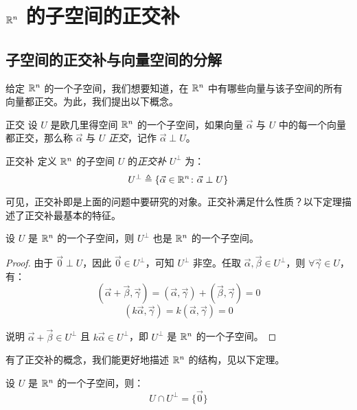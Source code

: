
\section{$\mathbb R^n$ 的子空间的正交补}

\subsection{子空间的正交补与向量空间的分解}

给定 $\mathbb R^n$ 的一个子空间，我们想要知道，在 $\mathbb R^n$ 中有哪些向量与该子空间的所有向量都正交。为此，我们提出以下概念。

\begin{definition}{正交}
	设 $U$ 是欧几里得空间 $\mathbb R^n$ 的一个子空间，如果向量 $\vec \alpha$ 与 $U$ 中的每一个向量都正交，那么称 $\vec \alpha$ 与 $U$ \emph{正交}，记作 $\vec \alpha \perp U$。
\end{definition}

\begin{definition}{正交补}
	定义 $\mathbb R^n$ 的子空间 $U$ 的\emph{正交补} $U^\perp$ 为：
	$$
	U^\perp \triangleq \{ \vec \alpha \in \mathbb R^n \colon \vec \alpha \perp U \}
	$$
\end{definition}

可见，正交补即是上面的问题中要研究的对象。正交补满足什么性质？以下定理描述了正交补最基本的特征。

\begin{theorem}
	设 $U$ 是 $\mathbb R^n$ 的一个子空间，则 $U^\perp$ 也是 $\mathbb R^n$ 的一个子空间。
\end{theorem}

\begin{proof}
	由于 $\vec 0 \perp U$，因此 $\vec 0 \in U^\perp$，可知 $U^\perp$ 非空。任取 $\vec \alpha, \vec \beta \in U^\perp$，则 $\forall \vec \gamma \in U$，有：
	$$
	(\vec \alpha + \vec \beta, \vec \gamma) = (\vec \alpha, \vec \gamma) + (\vec \beta, \vec \gamma) = 0
	$$$$
	(k \vec \alpha, \vec \gamma) = k(\vec \alpha, \vec \gamma) = 0
	$$

	说明 $\vec \alpha + \vec \beta \in U^\perp$ 且 $k \vec \alpha \in U^\perp$，即 $U^\perp$ 是 $\mathbb R^n$ 的一个子空间。
\end{proof}

有了正交补的概念，我们能更好地描述 $\mathbb R^n$ 的结构，见以下定理。

\begin{theorem}
	设 $U$ 是 $\mathbb R^n$ 的一个子空间，则：
	$$
	U \cap U^\perp = \{ \vec 0\}
	$$
\end{theorem}

